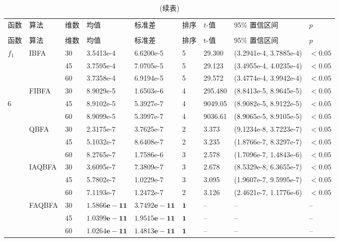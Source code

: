 \begin{longtable}[!tb]{p{0.3cm}p{1.2cm}p{0.3cm}p{2.45cm}p{2.45cm}p{0.5cm}p{1.2cm}p{4.5cm}p{1.5cm}}
\caption{$f_1-f_{7}$ 函数在不同维度下平均运行30次下均值和标准差\label{TableDifBFA}}
\vspace{0.5em}\\
        \hline
        函数  &  算法 & 维数	&   均值    &   标准差 & 排序&  $t$-值 &  95\% 置信区间 &  $p$   \\
        \hline
    \endfirsthead
        \caption{(续表)}\\
        \hline
         函数  &  算法 & 维数	&   均值    &   标准差 & 排序&  t-值 &  95\% 置信区间 &  $p$   \\
        \hline
    \endhead
        \hline
    \endfoot
        \hline
    \endlastfoot
$f_{1}$ &IBFA &30 &3.5413e-4 &6.6200e-5&5 &29.300 &(3.2941e-4, 3.7885e-4) & $<0.05$ \\
             & &45 &3.7595e-4 &7.0705e-5 &5 &29.123 &(3.4955e-4, 4.0235e-4) &$<0.05$  \\
             & &60 &3.7358e-4 &6.9194e-5 & 5&29.572 &(3.4774e-4, 3.9942e-4) &$<0.05$ \\
 &FIBFA &30 &8.9029e-5 &1.6503e-6& 4 &295.480 &(8.8413e-5, 8.9645e-5) &$<0.05$  \\6
             & &45 &8.9102e-5 &5.3927e-7 &4 &9049.05 &(8.9082e-5, 8.9122e-5) &$<0.05$  \\
             & &60 &8.9099e-5 &5.3997e-7 &4 &9036.61 &(8.9065e-5, 8.9105e-5) &$<0.05$  \\
 &QBFA &30 & 2.3175e-7 &3.7625e-7 &2  &3.373 &(9.1234e-8, 3.7223e-7) &$<0.05$\\
             & &45 &5.1032e-7  &8.6408e-7  &2  &3.235 &(1.8766e-7, 8.3297e-7) &$<0.05$\\
             & &60 &8.2765e-7 & 1.7586e-6 & 3 &2.578  &(1.7096e-7, 1.4843e-6) &$<0.05$\\
 &IAQBFA &30 &3.6095e-7 &7.3809e-7& 3&2.678 &(8.5329e-8, 6.3655e-7) &$<0.05$  \\
             & &45 &5.7802e-7 &1.0229e-7 &3&3.095 &(1.9607e-7, 9.5995e-7) &$<0.05$  \\
             & &60 &7.1193e-7 &1.2472e-7 & 2&3.126 &(2.4621e-7, 1.1776e-6) &$<0.05$  \\
 &FAQBFA &30 & $\bm{1.5866e-11}$ &$\bm{3.7492e-11}$ & $\bm{1}$&-- &-- &--  \\
             & &45 & $\bm{1.0399e-11}$ &$\bm{1.9515e-11}$  &$\bm{1}$ &-- &-- &--  \\
             & &60 & $\bm{1.0264e-11}$ & $\bm{1.4813e-11}$ & $\bm{1}$&-- &-- &--  \\

\end{longtable}
